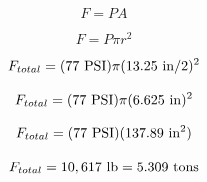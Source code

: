 












$$F = PA$$

$$F = P \pi r^2$$

$$F_{total} = (77 \hbox{ PSI}) \pi (13.25 \hbox{ in} / 2)^2$$

$$F_{total} = (77 \hbox{ PSI}) \pi (6.625 \hbox{ in})^2$$

$$F_{total} = (77 \hbox{ PSI}) (137.89 \hbox{ in}^2)$$

$$F_{total} = 10,617 \hbox{ lb} = 5.309 \hbox{ tons}$$



